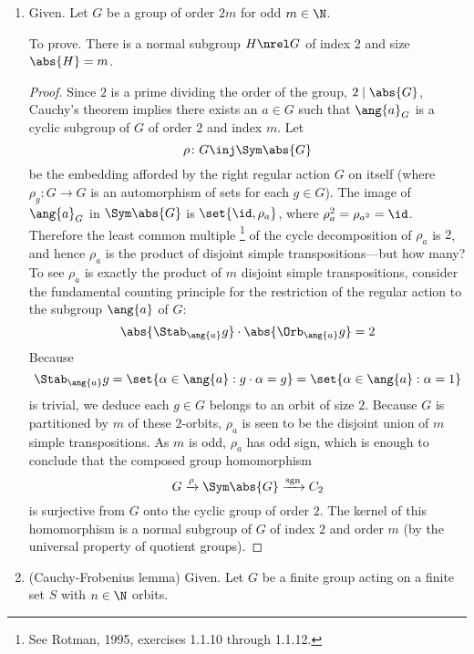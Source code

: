 \documentclass[onesided]{ccg-pset}
\begin{document}
\begin{enumerate}
    \item Given. Let $G$ be a group of order $2m$ for odd $m \in \N$. 

        To prove. There is a normal subgroup $H \nrel G$ of index $2$ and size $\abs{H} = m$.

\begin{proof}
    Since $2$ is a prime dividing the order of the group, $2 \mid \abs{G}$, Cauchy's theorem implies there exists an $a \in G$ such that $\ang{a}_G$ is a cyclic subgroup of $G$ of order $2$ and index $m$. Let $$\rho \colon G \inj \Sym \abs{G}$$ be the embedding afforded by the right regular action $G$ on itself (where $\rho_g \colon G \to G$ is an automorphism of sets for each $g \in G$). The image of $\ang{a}_G$ in $\Sym \abs{G}$ is $\set{\id, \rho_a}$, where $\rho_a^2 = \rho_{a^2} = \id$. Therefore the least common multiple%
        \footnote{%
            See Rotman, 1995, exercises 1.1.10 through 1.1.12.
        }
    of the cycle decomposition of $\rho_a$ is $2$, and hence $\rho_a$ is the product of disjoint simple transpositions---but how many? To see $\rho_a$ is exactly the product of $m$ disjoint simple transpositions, consider the fundamental counting principle for the restriction of the regular action to the subgroup $\ang{a}$ of $G$:
    \begin{equation*}
        \abs{\Stab_{\ang{a}} g} \cdot \abs{\Orb_{\ang{a}} g} = 2
    \end{equation*}
    Because $$\Stab_{\ang{a}} g = \set{\alpha \in \ang{a} : g \cdot \alpha = g} = \set{\alpha \in \ang{a} : \alpha = 1}$$ is trivial, we deduce each $g \in G$ belongs to an orbit of size $2$. Because $G$ is partitioned by $m$ of these $2$-orbits, $\rho_a$ is seen to be the disjoint union of $m$ simple transpositions. As $m$ is odd, $\rho_a$ has odd sign, which is enough to conclude that the composed group homomorphism
    \begin{equation*}
        G \xrightarrow{\rho} \Sym \abs{G} \xrightarrow{\text{sgn}} C_2
    \end{equation*}
    is surjective from $G$ onto the cyclic group of order $2$. The kernel of this homomorphism is a normal subgroup of $G$ of index $2$ and order $m$ (by the universal property of quotient groups).
\end{proof}

\item (Cauchy-Frobenius lemma) Given. Let $G$ be a finite group acting on a finite set $S$ with $n \in \N$ orbits. 


\end{enumerate}
\end{document}
